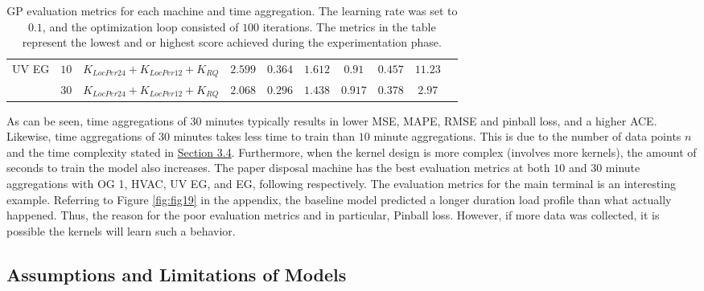 \begin{table}[htbp]
{\begin{tabular}{lccccccccc}
    UV EG 
     & $10$ & $K_{LocPer24} + K_{LocPer12} + K_{RQ}$ & $2.599$ & $0.364$ & $1.612$ & $0.91$ & $0.457$ & $11.23$ \\
     & $30$ & $K_{LocPer24} + K_{LocPer12} + K_{RQ}$ & $2.068$ & $0.296$ & $1.438$ & $0.917$ & $0.378$ & $2.97$ \\
     
    \hline
    \end{tabular}}
    \caption{GP evaluation metrics for each machine and time aggregation. The learning rate was set to $0.1$, and the optimization loop consisted of $100$ iterations. The metrics in the table represent the lowest and or highest score achieved during the experimentation phase.}
    \label{tab:tab3}
\end{table}

As can be seen, time aggregations of $30$ minutes typically results in lower MSE, MAPE, RMSE and pinball loss, and a higher ACE. Likewise, time aggregations of $30$ minutes takes less time to train than $10$ minute aggregations. This is due to the number of data points $n$ and the time complexity stated in \hyperlink{subsection.3.4}{Section 3.4}. Furthermore, when the kernel design is more complex (involves more kernels), the amount of seconds to train the model also increases. The paper disposal machine has the best evaluation metrics at both $10$ and $30$ minute aggregations with OG 1, HVAC, UV EG, and EG, following respectively. The evaluation metrics for the main terminal is an interesting example. Referring to Figure \ref{fig:fig19} in the appendix, the baseline model predicted a longer duration load profile than what actually happened. Thus, the reason for the poor evaluation metrics and in particular, Pinball loss. However, if more data was collected, it is possible the kernels will learn such a behavior.

\subsection{Assumptions and Limitations of Models}

